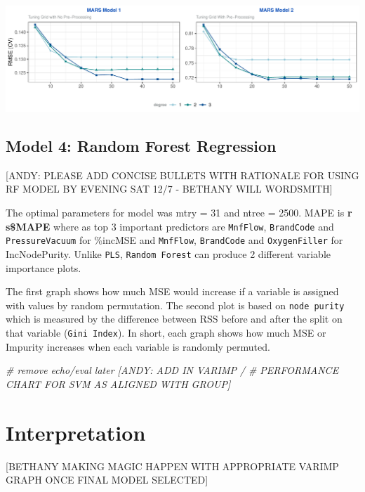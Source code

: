 \documentclass[]{report}
\newenvironment{Shaded}{\begin{snugshade}}{\end{snugshade}}
\newcommand{\CommentTok}[1]{\textcolor[rgb]{0.56,0.35,0.01}{\textit{#1}}}
\begin{document}
\includegraphics{Group2_Project2_Fall2019_files/figure-latex/unnamed-chunk-11-1.pdf}

\hypertarget{model-4-random-forest-regression}{%
\section{Model 4: Random Forest
Regression}\label{model-4-random-forest-regression}}

{[}ANDY: PLEASE ADD CONCISE BULLETS WITH RATIONALE FOR USING RF MODEL BY
EVENING SAT 12/7 - BETHANY WILL WORDSMITH{]}

The optimal parameters for model was mtry = 31 and ntree = 2500. MAPE is
\textbf{r s\$MAPE} where as top 3 important predictors are
\texttt{MnfFlow}, \texttt{BrandCode} and \texttt{PressureVacuum} for
\%incMSE and \texttt{MnfFlow}, \texttt{BrandCode} and
\texttt{OxygenFiller} for IncNodePurity. Unlike \texttt{PLS},
\texttt{Random\ Forest} can produce 2 different variable importance
plots.

The first graph shows how much MSE would increase if a variable is
assigned with values by random permutation. The second plot is based on
\texttt{node\ purity} which is measured by the difference between RSS
before and after the split on that variable (\texttt{Gini\ Index}). In
short, each graph shows how much MSE or Impurity increases when each
variable is randomly permuted.

\begin{Shaded}
\begin{Highlighting}[]
\CommentTok{# remove echo/eval later [ANDY: ADD IN VARIMP /}
\CommentTok{# PERFORMANCE CHART FOR SVM AS ALIGNED WITH GROUP]}
\end{Highlighting}
\end{Shaded}

\hypertarget{interpretation}{%
\chapter{Interpretation}\label{interpretation}}

{[}BETHANY MAKING MAGIC HAPPEN WITH APPROPRIATE VARIMP GRAPH ONCE FINAL
MODEL SELECTED{]}
\end{document}
